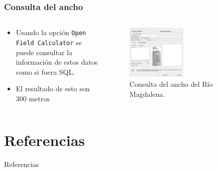 \documentclass[17pt, t, lualatex]{beamer}
\begin{document}
\begin{frame}
  \frametitle{Consulta del ancho}

  \begin{columns}
    \begin{column}{.3\textwidth}
      \begin{itemize}
        \item Usando la opción \texttt{Open Field Calculator} se puede consultar la información de estos datos como si fuera SQL.
        \item El resultado de esto son $300 \text{ metros}$
      \end{itemize}
    \end{column}

    \begin{column}{.7\textwidth}
      \begin{figure}[ht]
        \centering
        \includegraphics[width=0.5\textwidth]{img/QGIS-7.png}
        \caption{Consulta del ancho del Río Magdalena.}
      \end{figure}
    \end{column}
  \end{columns}



\end{frame}




\section{Referencias}

\insertsectionpage
\begin{frame}[allowframebreaks]{Referencias}
  \printbibliography
\end{frame}


\insertendpage
\end{document}
